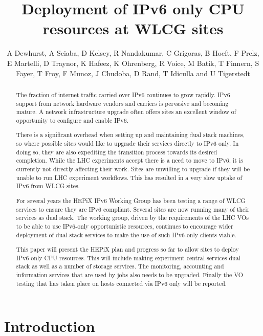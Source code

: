 \documentclass[a4paper]{jpconf}
\begin{document}
\title{Deployment of IPv6 only CPU resources at WLCG sites}

\author{A Dewhurst, A Sciaba, D Kelsey, R Nandakumar, C Grigoras, B Hoeft, F Prelz, E Martelli, D Traynor, K Hafeez, K Ohrenberg, R Voice, M Batik, T Finnern, S Fayer, T Froy, F Munoz, J Chudoba, D Rand, T Idiculla and U Tigerstedt}


\address{$^1$ STFC - Rutherford Appleton Lab. UK}


\begin{abstract}
The fraction of internet traffic carried over IPv6 continues to grow rapidly. IPv6 support from network hardware vendors and carriers is pervasive and becoming mature. A network infrastructure upgrade often offers sites an excellent window of opportunity to configure and enable IPv6.

There is a significant overhead when setting up and maintaining dual stack machines, so where possible sites would like to upgrade their services directly to IPv6 only. In doing so, they are also expediting the transition process towards its desired completion. While the LHC experiments accept there is a need to move to IPv6, it is currently not directly affecting their work. Sites are unwilling to upgrade if they will be unable to run LHC experiment workflows. This has resulted in a very slow uptake of IPv6 from WLCG sites.

For several years the HEPiX IPv6 Working Group has been testing a range of WLCG services to ensure they are IPv6 compliant. Several sites are now running many of their services as dual stack. The working group, driven by the requirements of the LHC VOs to be able to use IPv6-only opportunistic resources, continues to encourage wider deployment of dual-stack services to make the use of such IPv6-only clients viable.

This paper will present the HEPiX plan and progress so far to allow sites to deploy IPv6 only CPU resources. This will include making experiment central services dual stack as well as a number of storage services. The monitoring, accounting and information services that are used by jobs also needs to be upgraded. Finally the VO testing that has taken place on hosts connected via IPv6 only will be reported.
\end{abstract}

\section{Introduction}
\end{document}
